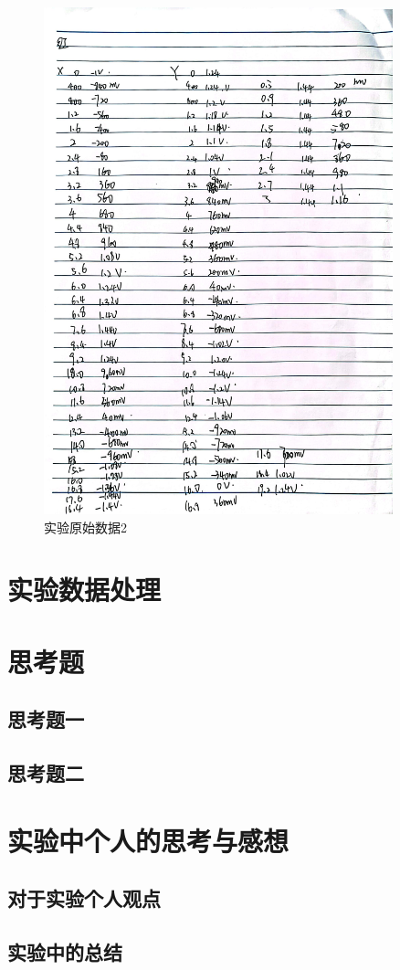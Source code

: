 \documentclass{ctexart}
\begin{document}
\begin{figure}[H]
  \centering
  \includegraphics[width=0.9\textwidth,height=0.8\textheight]{yuanshishujv2.jpg}
  \caption{实验原始数据2}
\end{figure}
\newpage







\section{实验数据处理}

\section{思考题}
  \subsection{思考题一}

  \subsection{思考题二}

\section{实验中个人的思考与感想}
  \subsection{对于实验个人观点}

  \subsection{实验中的总结}
\end{document}

